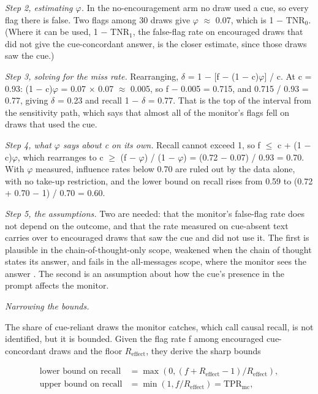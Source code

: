\documentclass[11pt]{article}
\begin{document}
\emph{Step 2, estimating $\varphi$.} In the no-encouragement arm no draw used a cue, so every flag there is false. Two flags among 30 draws give $\varphi$ $\approx$ 0.07, which is 1 $-$ $\mathrm{TNR}_0$. (Where it can be used, 1 $-$ $\mathrm{TNR}_1$, the false-flag rate on encouraged draws that did not give the cue-concordant answer, is the closer estimate, since those draws saw the cue.)

\emph{Step 3, solving for the miss rate.} Rearranging, $\delta$ = 1 $-$ [f $-$ (1 $-$ c)$\varphi$] / c. At c = 0.93: (1 $-$ c)$\varphi$ = 0.07 $\times$ 0.07 $\approx$ 0.005, so f $-$ 0.005 = 0.715, and 0.715 / 0.93 = 0.77, giving $\delta$ = 0.23 and recall 1 $-$ $\delta$ = 0.77. That is the top of the interval from the sensitivity path, which says that almost all of the monitor's flags fell on draws that used the cue.

\emph{Step 4, what $\varphi$ says about c on its own.} Recall cannot exceed 1, so f $\leq$ c + (1 $-$ c)$\varphi$, which rearranges to c $\geq$ (f $-$ $\varphi$) / (1 $-$ $\varphi$) = (0.72 $-$ 0.07) / 0.93 = 0.70. With $\varphi$ measured, influence rates below 0.70 are ruled out by the data alone, with no take-up restriction, and the lower bound on recall rises from 0.59 to (0.72 + 0.70 $-$ 1) / 0.70 = 0.60.

\emph{Step 5, the assumptions.} Two are needed: that the monitor's false-flag rate does not depend on the outcome, and that the rate measured on cue-absent text carries over to encouraged draws that saw the cue and did not use it. The first is plausible in the chain-of-thought-only scope, weakened when the chain of thought states its answer, and fails in the all-messages scope, where the monitor sees the answer \citep{imai2010causal}. The second is an assumption about how the cue's presence in the prompt affects the monitor.

\emph{Narrowing the bounds.}

The share of cue-reliant draws the monitor catches, which \citet*{guan2026beyond} call causal recall, is not identified, but it is bounded. Given the flag rate f among encouraged cue-concordant draws and the floor $R_{\mathrm{effect}}$, they derive the sharp bounds

\begin{align*}
  \text{lower bound on recall} &= \max(0, (f + R_{\mathrm{effect}} - 1) / R_{\mathrm{effect}}), \\
  \text{upper bound on recall} &= \min(1, f / R_{\mathrm{effect}}) = \mathrm{TPR}_{\mathrm{mc}},
\end{align*}
\end{document}
